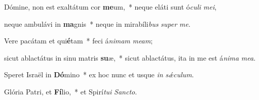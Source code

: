 \item Dómine, non est exaltátum cor \textbf{me}um,~* neque eláti sunt ó\textit{culi} \textit{mei},

\item neque ambulávi in \textbf{ma}gnis~* neque in mirabíli\textit{bus} \textit{super} \textit{me}.

\item Vere pacátam et qui\textbf{é}tam~* feci á\textit{nimam} \textit{meam};

\item sicut ablactátus in sinu matris \textbf{su}æ,~* sicut ablactátus, ita in me est á\textit{nima} \textit{mea}.

\item Speret Israël in \textbf{Dó}mino~* ex hoc nunc et usque \textit{in} \textit{sǽculum}.

\item Glória Patri, et \textbf{Fí}lio,~* et Spirí\textit{tui} \textit{Sancto}.

